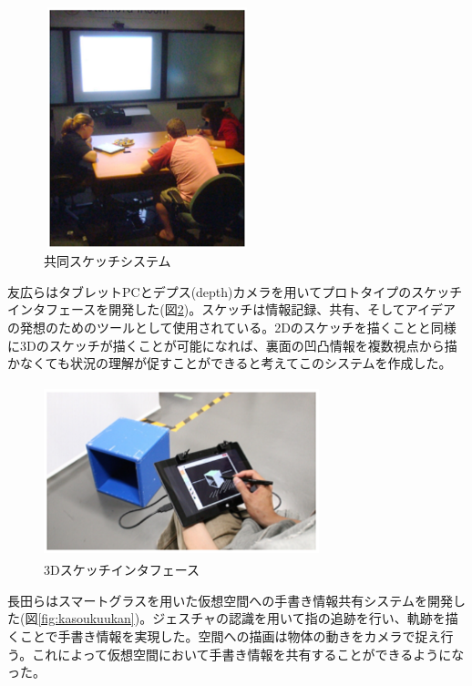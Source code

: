 \documentclass[11pt,a4j, titlepage]{jarticle} %
\begin{document}
\begin{figure}[H]
  \begin{center}
    \includegraphics[clip,height=7.0cm,width=6.0cm]{./collaborative_sketch.eps}
    \caption{共同スケッチシステム}
    \label{fig:collaborative_sketch}
  \end{center}
\end{figure}

友広ら\cite{tomohiro}はタブレットPCとデプス(depth)カメラを用いてプロトタイプのスケッチインタフェースを開発した(図\ref{fig:3dsketch})。スケッチは情報記録、共有、そしてアイデアの発想のためのツールとして使用されている。2Dのスケッチを描くことと同様に3Dのスケッチが描くことが可能になれば、裏面の凹凸情報を複数視点から描かなくても状況の理解が促すことができると考えてこのシステムを作成した。

\begin{figure}[H]
  \begin{center}
    \includegraphics[clip,height=5.0cm,width=8.0cm]{./3dsketch.eps}
    \caption{3Dスケッチインタフェース}
    \label{fig:3dsketch}
  \end{center}
\end{figure}

長田ら\cite{nagata}はスマートグラスを用いた仮想空間への手書き情報共有システムを開発した(図\ref{fig:kasoukuukan})。ジェスチャの認識を用いて指の追跡を行い、軌跡を描くことで手書き情報を実現した。空間への描画は物体の動きをカメラで捉え行う。これによって仮想空間において手書き情報を共有することができるようになった。
\end{document}
